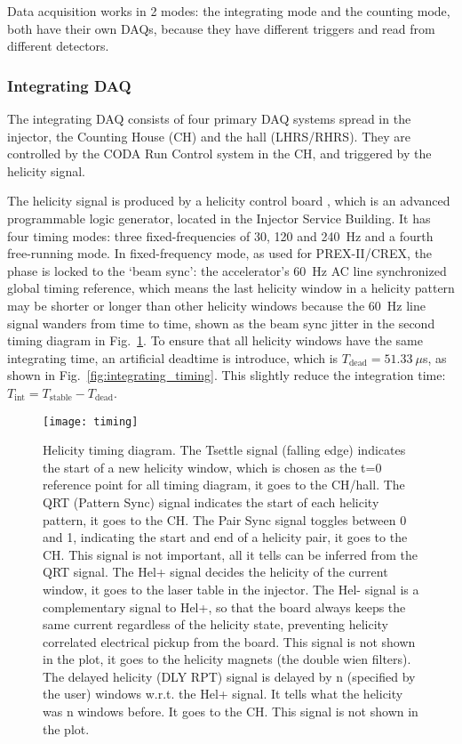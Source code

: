 Data acquisition works in 2 modes: the integrating mode and the counting mode,
both have their own DAQs, because they have different triggers and read from
different detectors.

\subsubsection{Integrating DAQ}
The integrating DAQ consists of four primary DAQ systems spread in the injector,
the Counting House (CH) and the hall (LHRS/RHRS). They are controlled by the
CODA Run Control system in the CH, and triggered by the helicity signal.

The helicity signal is produced by a helicity control board \cite{Hboard}, which 
is an advanced programmable logic generator, located in the Injector Service Building.
It has four timing modes: three fixed-frequencies of 30, 120 and 240~Hz
and a fourth free-running mode. In fixed-frequency mode, as used for PREX-II/CREX,
the phase is locked to the `beam sync': the accelerator's 60~Hz AC line synchronized 
global timing reference, which means the last helicity window in a helicity pattern
may be shorter or longer than other helicity windows because the 60~Hz line signal
wanders from time to time, shown as the beam sync jitter in the second timing diagram 
in Fig.~\ref{fig:timing}. To ensure that all helicity windows have the same integrating
time, an artificial deadtime is introduce, which is $T_{\text{dead}} = 51.33\ \mu$s,
as shown in Fig.~\ref{fig:integrating_timing}.
This slightly reduce the integration time: $T_{\text{int}} = T_{\text{stable}} - T_{\text{dead}}$.

\begin{figure}
    \centering
    \texttt{[image: timing]}
    \caption{Helicity timing diagram. The Tsettle signal (falling edge) indicates 
    the start of a new helicity window, which is chosen as the t=0 reference
    point for all timing diagram, it goes to the CH/hall.
    The QRT (Pattern Sync) signal indicates the start of each helicity pattern,
    it goes to the CH. 
    The Pair Sync signal toggles between 0 and 1, indicating the start and end
    of a helicity pair, it goes to the CH. This signal is not important, all it
    tells can be inferred from the QRT signal.
    The Hel+ signal decides the helicity of the current window, it goes to the 
    laser table in the injector.
    The Hel- signal is a complementary signal to Hel+, so that the board always 
    keeps the same current regardless of the helicity state, preventing helicity 
    correlated electrical pickup from the board. This signal is not shown in the
    plot, it goes to the helicity magnets (the double wien filters).
    The delayed helicity (DLY RPT) signal is delayed by n (specified by the user) 
    windows w.r.t. the Hel+ signal.
    It tells what the helicity was n windows before. It goes to the CH. This
    signal is not shown in the plot.}
    \label{fig:timing}
\end{figure}

